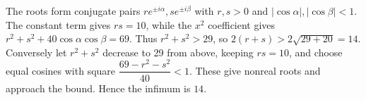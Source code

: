 The roots form conjugate pairs $re^{\pm i\alpha},se^{\pm i\beta}$ with $r,s>0$ and $|\cos\alpha|,|\cos\beta|<1$. The constant term gives $rs=10$, while the $x^2$ coefficient gives $r^2+s^2+40\cos\alpha\cos\beta=69$. Thus $r^2+s^2>29$, so $2(r+s)>2\sqrt{29+20}=14$. Conversely let $r^2+s^2$ decrease to 29 from above, keeping $rs=10$, and choose equal cosines with square $\dfrac{69-r^2-s^2}{40} < 1$. These give nonreal roots and approach the bound. Hence the infimum is $\boxed{14}$.
